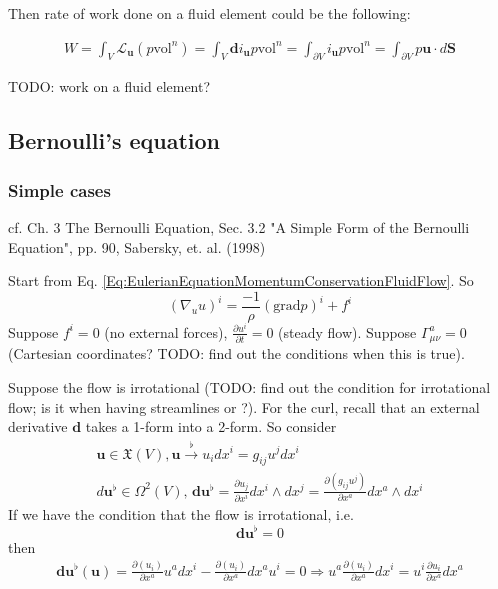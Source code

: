 \documentclass[10pt]{amsart}
\begin{document}
\begin{multicols*}{2}
Then rate of work done on a fluid element could be the following:

\[
\begin{gathered}
W = \int_V \mathcal{L}_{\mathbf{u}}(p \text{vol}^n) = \int_V \mathbf{d} i_{\mathbf{u}} p \text{vol}^n = \int_{\partial V} i_{\mathbf{u}} p \text{vol}^n = \int_{\partial V} p \mathbf{u} \cdot d\mathbf{S} 
\end{gathered}
\]

TODO: work on a fluid element?

\subsection{Bernoulli's equation}

\subsubsection{Simple cases}

cf. Ch. 3 The Bernoulli Equation, Sec. 3.2 "A Simple Form of the Bernoulli Equation", pp. 90, Sabersky, et. al. (1998) \cite{SAHG1998}


Start from Eq. \ref{Eq:EulerianEquationMomentumConservationFluidFlow}. So
\[
(\nabla_u u)^i = \frac{-1}{\rho} (\text{grad}p)^i + f^i
\]
Suppose $f^i=0$ (no external forces), $\frac{\partial u^i}{\partial t} = 0$ (steady flow). Suppose $\Gamma^a_{\mu \nu} =0$ (Cartesian coordinates? TODO: find out the conditions when this is true).

Suppose the flow is irrotational (TODO: find out the condition for irrotational flow; is it when having streamlines or ?). For the curl, recall that an external derivative $\mathbf{d}$ takes a 1-form into a 2-form. So consider
\[
\begin{gathered}
 \mathbf{u} \in \mathfrak{X}(V), \mathbf{u} \xrightarrow{\flat} u_i dx^i = g_{ij} u^j dx^i \\ 
 d\mathbf{u}^{\flat} \in \Omega^2(V), \, \mathbf{d}\mathbf{u}^{\flat} = \frac{\partial u_j}{\partial x^i} dx^i \wedge dx^j = \frac{ \partial (g_{ij} u^j) }{\partial x^a} dx^a \wedge dx^i
\end{gathered}
\]
If we have the condition that the flow is irrotational, i.e. 
\begin{equation}
\mathbf{d}\mathbf{u}^{\flat} = 0
\end{equation}
then
\[
\begin{gathered}
	\mathbf{d}\mathbf{u}^{\flat} (\mathbf{u}) = \frac{\partial (u_i) }{ \partial x^a} u^a dx^i - \frac{\partial (u_i) }{ \partial x^a} dx^a u^i = 0 \Longrightarrow u^a \frac{ \partial (u_i) }{ \partial x^a} dx^i = u^i \frac{\partial u_i}{ \partial x^a} dx^a
\end{gathered}
\]


\end{multicols*}
\end{document}
